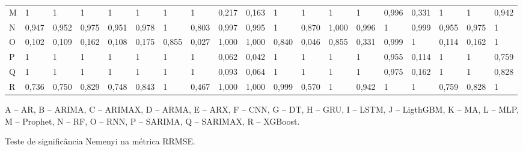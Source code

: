 \begin{landscape}
\begin{table}[!htb]
\begin{tabular}{@{}lllllllllllllllllll@{}}
M      & 1     & 1     & 1     & 1     & 1     & 1     & 1     & 0,217 & 0,163 & 1     & 1     & 1     & 1     & 0,996 & 0,331 & 1     & 1     & 0,942 \\
N      & 0,947 & 0,952 & 0,975 & 0,951 & 0,978 & 1     & 0,803 & 0,997 & 0,995 & 1     & 0,870 & 1,000 & 0,996 & 1     & 0,999 & 0,955 & 0,975 & 1     \\
O      & 0,102 & 0,109 & 0,162 & 0,108 & 0,175 & 0,855 & 0,027 & 1,000 & 1,000 & 0,840 & 0,046 & 0,855 & 0,331 & 0,999 & 1     & 0,114 & 0,162 & 1     \\
P      & 1     & 1     & 1     & 1     & 1     & 1     & 1     & 0,062 & 0,042 & 1     & 1     & 1     & 1     & 0,955 & 0,114 & 1     & 1     & 0,759 \\
Q      & 1     & 1     & 1     & 1     & 1     & 1     & 1     & 0,093 & 0,064 & 1     & 1     & 1     & 1     & 0,975 & 0,162 & 1     & 1     & 0,828 \\
R      & 0,736 & 0,750 & 0,829 & 0,748 & 0,843 & 1     & 0,467 & 1,000 & 1,000 & 0,999 & 0,570 & 1     & 0,942 & 1     & 1     & 0,759 & 0,828 & 1     \\ \bottomrule
\end{tabular}
	\vspace{2mm}
	
	\captionsetup{justification=centering} %
	A -- AR,
	B -- ARIMA,
	C -- ARIMAX,
	D -- ARMA,
	E -- ARX,
	F -- CNN,
	G -- DT,
	H -- GRU,
	I -- LSTM,
	J -- LigthGBM,
	K -- MA,
	L -- MLP,
	M -- Prophet,
	N -- RF,
	O -- RNN,
	P -- SARIMA,
	Q -- SARIMAX,
	R -- XGBoost.
	
\end{table}

	\begin{table}[!htb]
	\caption{Teste de significância Nemenyi na métrica RRMSE.}\label{tb:nemenyi2}
	\centering


\end{table}
\end{landscape}
